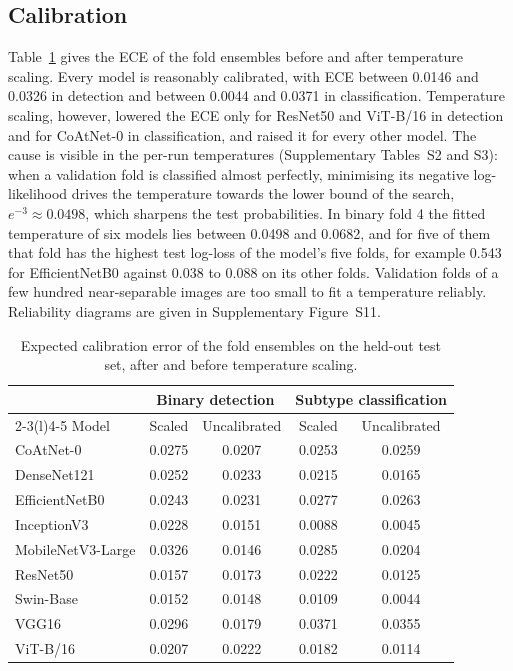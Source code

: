 \documentclass[final,3p,times,number]{elsarticle}
\begin{document}
\subsection{Calibration}
\label{sec:calibration}

Table~\ref{tab:calibration} gives the ECE of the fold ensembles before and after temperature scaling. Every model is reasonably calibrated, with ECE between 0.0146 and 0.0326 in detection and between 0.0044 and 0.0371 in classification. Temperature scaling, however, lowered the ECE only for ResNet50 and ViT-B/16 in detection and for CoAtNet-0 in classification, and raised it for every other model. The cause is visible in the per-run temperatures (Supplementary Tables~S2 and S3): when a validation fold is classified almost perfectly, minimising its negative log-likelihood drives the temperature towards the lower bound of the search, $e^{-3}\approx 0.0498$, which sharpens the test probabilities. In binary fold 4 the fitted temperature of six models lies between 0.0498 and 0.0682, and for five of them that fold has the highest test log-loss of the model's five folds, for example 0.543 for EfficientNetB0 against 0.038 to 0.088 on its other folds. Validation folds of a few hundred near-separable images are too small to fit a temperature reliably. Reliability diagrams are given in Supplementary Figure~S11.

\begin{table}[htbp]
\centering
\caption{Expected calibration error of the fold ensembles on the held-out test set, after and before temperature scaling.}
\label{tab:calibration}
\small
\begin{tabular*}{\textwidth}{@{\extracolsep{\fill}}lcccc@{}}
\toprule
 & \multicolumn{2}{c}{Binary detection} & \multicolumn{2}{c}{Subtype classification} \\
\cmidrule(lr){2-3}\cmidrule(l){4-5}
Model & Scaled & Uncalibrated & Scaled & Uncalibrated \\
\midrule
CoAtNet-0 & 0.0275 & 0.0207 & 0.0253 & 0.0259 \\
DenseNet121 & 0.0252 & 0.0233 & 0.0215 & 0.0165 \\
EfficientNetB0 & 0.0243 & 0.0231 & 0.0277 & 0.0263 \\
InceptionV3 & 0.0228 & 0.0151 & 0.0088 & 0.0045 \\
MobileNetV3-Large & 0.0326 & 0.0146 & 0.0285 & 0.0204 \\
ResNet50 & 0.0157 & 0.0173 & 0.0222 & 0.0125 \\
Swin-Base & 0.0152 & 0.0148 & 0.0109 & 0.0044 \\
VGG16 & 0.0296 & 0.0179 & 0.0371 & 0.0355 \\
ViT-B/16 & 0.0207 & 0.0222 & 0.0182 & 0.0114 \\
\bottomrule
\end{tabular*}
\end{table}
\end{document}
